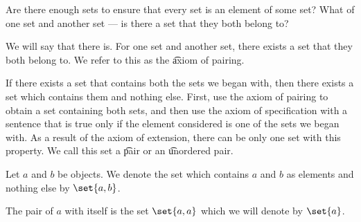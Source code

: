 
\sbasic








\sstart
{}


Are there enough sets to ensure that every set is an element of some set?
What of one set and another set --- is there a set that they both belong to?


We will say that there is.
For one set and another set, there exists a set that they both belong to.
We refer to this as the \t{axiom of pairing}.

If there exists a set that contains both the sets we began with, then there exists a set which contains them and nothing else.
First, use the axiom of pairing to obtain a set containing both sets, and then use the axiom of specification with a sentence that is true only if the element considered is one of the sets we began with.
As a result of the axiom of extension, there can be only one set with this property.
We call this set a \t{pair} or an \t{unordered pair}.


Let $a$ and $b$ be objects.
We denote the set which contains $a$ and $b$ as elements and nothing else by $\set{a, b}$.

The pair of $a$ with itself is the set $\set{a, a}$ which we will denote by $\set{a}$.
\strats
